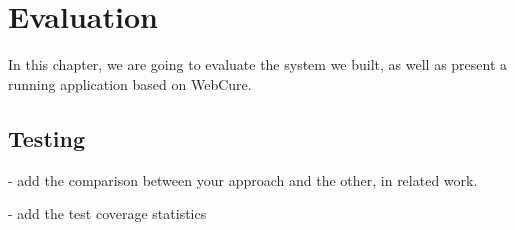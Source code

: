 \chapter{Evaluation}
\label{Evaluation}

In this chapter, we are going to evaluate the system we built, as well as present a running application based on WebCure. 

\section{Testing}





- add the comparison between your approach and the other, in related work.

- add the test coverage statistics


